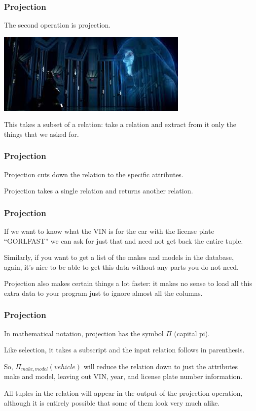 \begin{frame}
\frametitle{Projection}

The second operation is \alert{projection}. 

\begin{center}
	\includegraphics[width=0.7\textwidth]{images/projection.jpg}
\end{center}

This takes a subset of a relation: take a relation and extract from it only the things that we asked for. 

\end{frame}



\begin{frame}
\frametitle{Projection}

Projection cuts down the relation to the specific attributes. 

Projection takes a single relation and returns another relation.


\end{frame}



\begin{frame}
\frametitle{Projection}

If we want to know what the VIN is for the car with the license plate ``GORLFAST'' we can ask for just that and need not get back the entire tuple. 

Similarly, if you want to get a list of the makes and models in the database, again, it's nice to be able to get this data without any parts you do not need. 

Projection also makes certain things a lot faster: it makes no sense to load all this extra data to your program just to ignore almost all the columns.

\end{frame}



\begin{frame}
\frametitle{Projection}

In mathematical notation, projection has the symbol $\Pi$ (capital pi). 

Like selection, it takes a subscript and the input relation follows in parenthesis. 

So, $\Pi_{make, model}( vehicle )$ will reduce the relation down to just the attributes make and model, leaving out VIN, year, and license plate number information.

All tuples in the relation will appear in the output of the projection operation, although it is entirely possible that some of them look very much alike. 

\end{frame}



